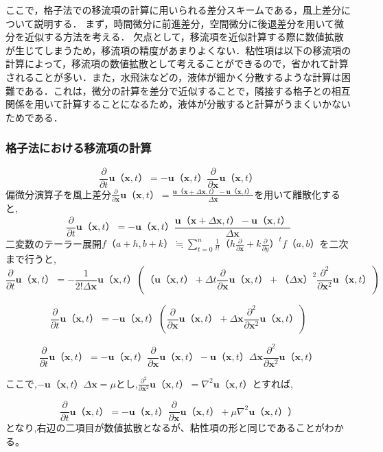 \documentclass[a4j,12pt]{jreport}
\begin{document}
ここで，格子法での移流項の計算に用いられる差分スキームである，風上差分について説明する．
まず，時間微分に前進差分，空間微分に後退差分を用いて微分を近似する方法を考える．
欠点として，移流項を近似計算する際に数値拡散が生じてしまうため，移流項の精度があまりよくない．粘性項は以下の移流項の計算によって，移流項の数値拡散として考えることができるので，省かれて計算されることが多い．また，水飛沫などの，液体が細かく分散するような計算は困難である．これは，微分の計算を差分で近似することで，隣接する格子との相互関係を用いて計算することになるため，液体が分散すると計算がうまくいかないためである．

\subsubsection{格子法における移流項の計算} \label{subsec:gridadvect}
$$\frac{\partial}{\partial t}\bm{u}（\bm{x},t） = -\bm{u}（\bm{x},t）\frac{\partial}{\partial \bm{x}}\bm{u}（\bm{x},t）$$
偏微分演算子を風上差分$\frac{\partial}{\partial \bm{x}}\bm{u}（\bm{x},t） = \frac{\bm{u}（\bm{x}+\varDelta \bm{x},t） - \bm{u}（\bm{x},t）}{\varDelta \bm{x}}$を用いて離散化すると,
$$\frac{\partial}{\partial t}\bm{u}（\bm{x},t） =  -\bm{u}（\bm{x},t）\frac{\bm{u}（\bm{x}+\varDelta \bm{x},t） - \bm{u}（\bm{x},t）}{\varDelta \bm{x}}$$
二変数のテーラー展開$f（a+h,b+k） \fallingdotseq \sum\limits_{t=0}^n \frac{1}{t!}（h\frac{\partial}{\partial \bm{x}} + k\frac{\partial}{\partial y}）^t f（a,b）$を二次まで行うと,
$$\frac{\partial}{\partial t}\bm{u}（\bm{x},t） = -\frac{1}{2!\varDelta \bm{x}}\bm{u}（\bm{x},t）\left( （\bm{u}（\bm{x},t）+\varDelta t\frac{\partial}{\partial \bm{x}}\bm{u}（\bm{x},t） + （\varDelta \bm{x}）^2\frac{\partial^2}{\partial \bm{x}^2}\bm{u}（\bm{x},t） \right)$$
            
$$\frac{\partial}{\partial t}\bm{u}（\bm{x},t） =  -\bm{u}（\bm{x},t）\left(\frac{\partial}{\partial \bm{x}}\bm{u}（\bm{x},t） + \varDelta \bm{x}\frac{\partial^2}{\partial \bm{x}^2}\bm{u}（\bm{x},t） \right)$$

$$ \frac{\partial}{\partial t}\bm{u}（\bm{x},t） =  -\bm{u}（\bm{x},t）\frac{\partial}{\partial \bm{x}}\bm{u}（\bm{x},t） -\bm{u}（\bm{x},t）\varDelta \bm{x}\frac{\partial^2}{\partial \bm{x}^2}\bm{u}（\bm{x},t）$$

ここで,$ -\bm{u}（\bm{x},t）\varDelta \bm{x} = \mu$とし,$\frac{\partial^2}{\partial \bm{x}^2}\bm{u}（\bm{x},t） = \nabla^2\bm{u}（\bm{x},t）$とすれば,

$$ \frac{\partial}{\partial t}\bm{u}（\bm{x},t） =  -\bm{u}（\bm{x},t）\frac{\partial}{\partial \bm{x}}\bm{u}（\bm{x},t） +\mu\nabla^2\bm{u}（\bm{x},t））$$
となり,右辺の二項目が数値拡散となるが、粘性項の形と同じであることがわかる。
\end{document}
